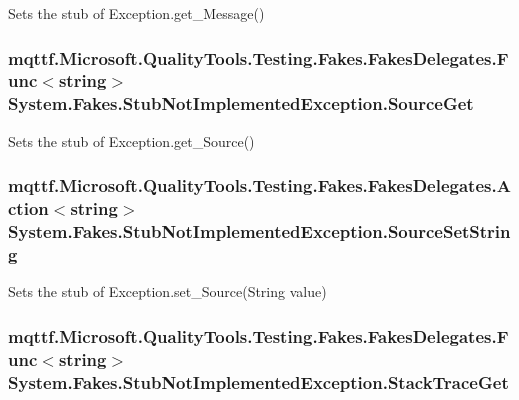 Sets the stub of Exception.\-get\-\_\-\-Message()

\hypertarget{class_system_1_1_fakes_1_1_stub_not_implemented_exception_abaf2b074af70e9ce962a74a3daf4a80c}{
\subsubsection[{Source\-Get}]{\setlength{\rightskip}{0pt plus 5cm}mqttf.\-Microsoft.\-Quality\-Tools.\-Testing.\-Fakes.\-Fakes\-Delegates.\-Func$<$string$>$ System.\-Fakes.\-Stub\-Not\-Implemented\-Exception.\-Source\-Get}}\label{class_system_1_1_fakes_1_1_stub_not_implemented_exception_abaf2b074af70e9ce962a74a3daf4a80c}


Sets the stub of Exception.\-get\-\_\-\-Source()

\hypertarget{class_system_1_1_fakes_1_1_stub_not_implemented_exception_a9bd54ee0cad6d3c66069f4d168c7bcfb}{
\subsubsection[{Source\-Set\-String}]{\setlength{\rightskip}{0pt plus 5cm}mqttf.\-Microsoft.\-Quality\-Tools.\-Testing.\-Fakes.\-Fakes\-Delegates.\-Action$<$string$>$ System.\-Fakes.\-Stub\-Not\-Implemented\-Exception.\-Source\-Set\-String}}\label{class_system_1_1_fakes_1_1_stub_not_implemented_exception_a9bd54ee0cad6d3c66069f4d168c7bcfb}


Sets the stub of Exception.\-set\-\_\-\-Source(\-String value)

\hypertarget{class_system_1_1_fakes_1_1_stub_not_implemented_exception_a391b84529242f86174e479d8771cefaa}{
\subsubsection[{Stack\-Trace\-Get}]{\setlength{\rightskip}{0pt plus 5cm}mqttf.\-Microsoft.\-Quality\-Tools.\-Testing.\-Fakes.\-Fakes\-Delegates.\-Func$<$string$>$ System.\-Fakes.\-Stub\-Not\-Implemented\-Exception.\-Stack\-Trace\-Get}}\label{class_system_1_1_fakes_1_1_stub_not_implemented_exception_a391b84529242f86174e479d8771cefaa}



